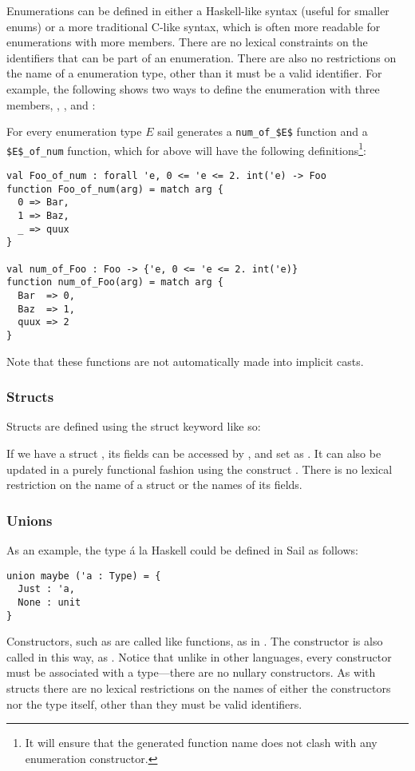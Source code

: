 Enumerations can be defined in either a Haskell-like syntax (useful
for smaller enums) or a more traditional C-like syntax, which is often
more readable for enumerations with more members. There are no lexical
constraints on the identifiers that can be part of an
enumeration. There are also no restrictions on the name of a
enumeration type, other than it must be a valid identifier. For
example, the following shows two ways to define the enumeration
 with three members, , , and :




For every enumeration type $E$ sail generates a
\lstinline[mathescape]{num_of_$E$} function and a
\lstinline[mathescape]{$E$_of_num} function, which for  above
will have the following definitions\footnote{It will ensure that the
  generated function name  does not clash with any enumeration
  constructor.}:
\begin{lstlisting}
val Foo_of_num : forall 'e, 0 <= 'e <= 2. int('e) -> Foo
function Foo_of_num(arg) = match arg {
  0 => Bar,
  1 => Baz,
  _ => quux
}

val num_of_Foo : Foo -> {'e, 0 <= 'e <= 2. int('e)}
function num_of_Foo(arg) = match arg {
  Bar  => 0,
  Baz  => 1,
  quux => 2
}
\end{lstlisting}
Note that these functions are not automatically made into implicit
casts.

\subsubsection{Structs}

Structs are defined using the struct keyword like so:


If we have a struct , its fields can be accessed by
, and set as . It can also be updated in
a purely functional fashion using the construct . There is no lexical restriction on the name of a struct or
the names of its fields.

\subsubsection{Unions}
\label{sec:union}

As an example, the  type \'{a} la Haskell could be defined
in Sail as follows:
\begin{lstlisting}
union maybe ('a : Type) = {
  Just : 'a,
  None : unit
}
\end{lstlisting}
Constructors, such as  are called like functions, as in
. The  constructor is also called in
this way, as . Notice that unlike in other languages, every
constructor must be associated with a type---there are no nullary
constructors. As with structs there are no lexical restrictions on the
names of either the constructors nor the type itself, other than they
must be valid identifiers.

